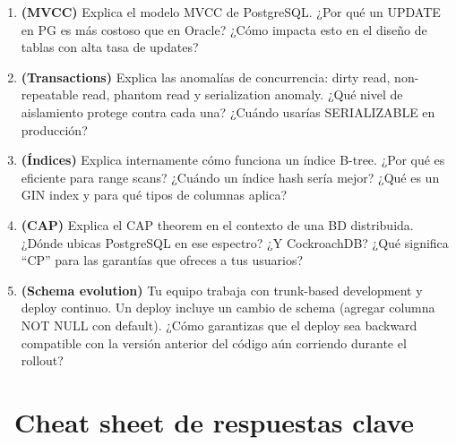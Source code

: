 \begin{entrevistabox}
\begin{enumerate}
  \item \textbf{(MVCC)} Explica el modelo MVCC de PostgreSQL. ¿Por qué un UPDATE en PG es más costoso que en Oracle? ¿Cómo impacta esto en el diseño de tablas con alta tasa de updates?

  \item \textbf{(Transactions)} Explica las anomalías de concurrencia: dirty read, non-repeatable read, phantom read y serialization anomaly. ¿Qué nivel de aislamiento protege contra cada una? ¿Cuándo usarías SERIALIZABLE en producción?

  \item \textbf{(Índices)} Explica internamente cómo funciona un índice B-tree. ¿Por qué es eficiente para range scans? ¿Cuándo un índice hash sería mejor? ¿Qué es un GIN index y para qué tipos de columnas aplica?

  \item \textbf{(CAP)} Explica el CAP theorem en el contexto de una BD distribuida. ¿Dónde ubicas PostgreSQL en ese espectro? ¿Y CockroachDB? ¿Qué significa ``CP'' para las garantías que ofreces a tus usuarios?

  \item \textbf{(Schema evolution)} Tu equipo trabaja con trunk-based development y deploy continuo. Un deploy incluye un cambio de schema (agregar columna NOT NULL con default). ¿Cómo garantizas que el deploy sea backward compatible con la versión anterior del código aún corriendo durante el rollout?
\end{enumerate}
\end{entrevistabox}

\section[Cheat sheet de respuestas clave]{~Cheat sheet de respuestas clave}

